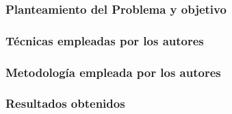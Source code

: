 \subsubsection{Planteamiento del Problema y objetivo }


\subsubsection{Técnicas empleadas por los autores}
 

\subsubsection{Metodología empleada por los autores}


\subsubsection{Resultados obtenidos}
